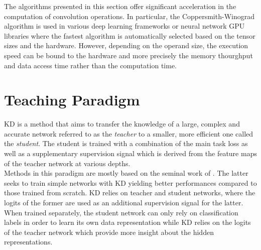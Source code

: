 The algorithms presented in this section offer significant acceleration in the
computation of convolution operations. In particular, the Coppersmith-Winograd
algorithm is used in various deep learning frameworks
\cite{DBLP:journals/corr/AbadiABBCCCDDDG16,DBLP:conf/nips/PaszkeGMLBCKLGA19} or
neural network \ac{GPU} libraries \cite{nvidia_cudnn} where the fastest
algorithm is automatically selected based on the tensor sizes and the hardware.
However, depending on the operand size, the execution speed can be bound to the
hardware and more precisely the memory thourghput and data access time rather
than the computation time.
\cite{DBLP:journals/pc/WhaleyPD01,DBLP:journals/cca/DrevetIS10}


\section{Teaching Paradigm}


\acf{KD} is a method that aims to transfer the knowledge of a large, complex and
accurate network referred to as the \emph{teacher} to a smaller, more efficient
one called the \emph{student}. The student is trained with a combination of the
main task loss as well as a supplementary supervision signal which is derived
from the feature maps of the teacher network at various depths.\\

Methods in this paradigm are mostly based on the seminal work of
\citeauthor{DBLP:journals/corr/HintonVD15} \cite{DBLP:journals/corr/HintonVD15}.
The latter seeks to train simple networks with \acl{KD} yielding better
performances compared to those trained from scratch. \ac{KD} relies on teacher
and student networks, where the logits of the former are used as an additional
supervision signal for the latter. When trained separately, the student network
can only rely on classification labels in order to learn its own data
representation while \ac{KD} relies on the logits of the teacher network which
provide more insight about the hidden representations.\\

